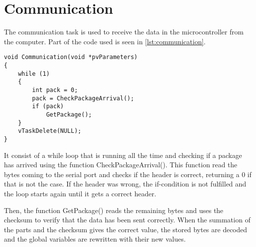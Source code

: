 \section{Communication}
The communication task is used to receive the data in the microcontroller from the computer. Part of the code used is seen in \autoref{lst:communication}.

\begin{lstlisting}[style=customcpp,
                caption={Code for the comunication task.}, 
                label=lst:communication]
void Communication(void *pvParameters)
{
    while (1)
    {
        int pack = 0;
        pack = CheckPackageArrival();
        if (pack)
            GetPackage();
    }
    vTaskDelete(NULL);
}
\end{lstlisting}

It consist of a while loop that is running all the time and checking if a package has arrived using the function CheckPackageArrival(). This function read the bytes coming to the serial port and checks if the header is correct, returning a 0 if that is not the case. If the header was wrong, the if-condition is not fulfilled and the loop starts again until it gets a correct header.

Then, the function GetPackage() reads the remaining bytes and uses the checksum to verify that the data has been sent correctly. When the summation of the parts and the checksum gives the correct value, the stored bytes are decoded and the global variables are rewritten with their new values.